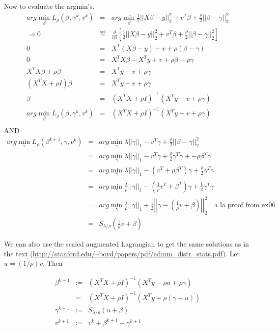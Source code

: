 \documentclass{article}
\begin{document}
Now to evaluate the argmin's. 
\begin{eqnarray*}
 arg\min_{\beta} L_\rho(\beta,\gamma^k,v^k) 
&=& arg\min_{\beta} \frac{1}{2} ||X\beta - y||^2_2 + v^T\beta + \frac{\rho}{2} || \beta - \gamma||^2_2 \\
\Rightarrow 0 &\stackrel{set}{=}& \frac{\partial}{\partial\beta}  \left[ \frac{1}{2} ||X\beta - y||^2_2 + v^T\beta + \frac{\rho}{2} || \beta - \gamma||^2_2 \right]\\
0 & = &  X^T(X\beta - y) + v + \rho ( \beta - \gamma)\\
0 & = &  X^TX\beta - X^Ty + v +  \rho\beta - \rho\gamma\\
X^TX\beta +\rho\beta & = &    X^Ty - v +  \rho\gamma\\
(X^TX +\rho I) \beta & = &    X^Ty - v +  \rho\gamma\\
 \beta & = &    (X^TX +\rho I)^{-1}(X^Ty - v +  \rho\gamma) \\
 arg\min_{\beta} L_\rho(\beta,\gamma^k,v^k) 
&=& (X^TX +\rho I)^{-1}(X^Ty - v +  \rho\gamma) \\
\end{eqnarray*}
AND
\begin{eqnarray*}
 arg\min_{\gamma} L_\rho(\beta^{k+1},\gamma,v^k) 
&=& arg\min_{\gamma}  \lambda ||\gamma||_1 - v^T \gamma + \frac{\rho}{2} || \beta - \gamma||^2_2 \\
&=& arg\min_{\gamma}  \lambda ||\gamma||_1 - v^T \gamma + \frac{\rho}{2} \gamma^T\gamma + - \rho\beta^T\gamma \\
&=& arg\min_{\gamma}  \lambda ||\gamma||_1 - (v^T + \rho\beta^T) \gamma + \frac{\rho}{2} \gamma^T\gamma \\
&=& arg\min_{\gamma}  \frac{\lambda}{\rho} ||\gamma||_1 - \left( \frac{1}{\rho}v^T + \beta^T \right) \gamma + \frac{1}{2} \gamma^T\gamma \\
&=& arg\min_{\gamma} \frac{\lambda}{\rho} ||\gamma||_1 + \frac{1}{2} \left| \left| \gamma - \left(\frac{1}{\rho}v + \beta \right) \right| \right|^2_2   \quad \text{a la proof from ex06}\\
&=& S_{\lambda/\rho}\left(\frac{1}{\rho}v + \beta\right) 
\end{eqnarray*}

We can also use the scaled augmented Lagrangian to get the same solutions as in the text (\url{http://stanford.edu/~boyd/papers/pdf/admm_distr_stats.pdf}). Let $u = (1/\rho)v$. Then 

\begin{eqnarray*}
\beta^{k+1} &:=& (X^TX +\rho I)^{-1}(X^Ty - \rho u +  \rho\gamma)  \\
&=& (X^TX +\rho I)^{-1}(X^Ty + \rho(\gamma - u)  ) \\
\gamma^{k+1} &:=& S_{\lambda/\rho}\left(u + \beta\right)  \\
v^{k+1} &:=& v^k + \beta^{k+1} - \gamma^{k+1}. \\
\end{eqnarray*}
\end{document}
